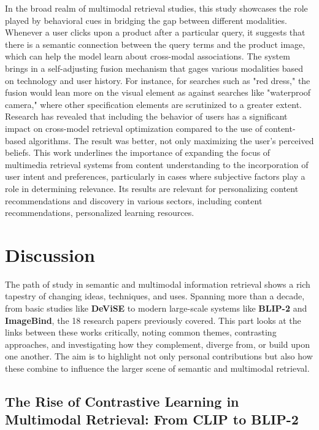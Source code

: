 \documentclass[conference]{IEEEtran}
\begin{document}
\begin{enumerate}
In the broad realm of multimodal retrieval studies, this study showcases the role played by behavioral cues in bridging the gap between different modalities. Whenever a user clicks upon a product after a particular query, it suggests that there is a semantic connection between the query terms and the product image, which can help the model learn about cross-modal associations.
The system brings in a self-adjusting fusion mechanism that gages various modalities based on technology and user history. For instance, for searches such as "red dress," the fusion would lean more on the visual element as against searches like "waterproof camera," where other specification elements are scrutinized to a greater extent.
Research has revealed that including the behavior of users has a significant impact on cross-model retrieval optimization compared to the use of content-based algorithms. The result was better, not only maximizing the user’s perceived beliefs.
This work underlines the importance of expanding the focus of multimedia retrieval systems from content understanding to the incorporation of user intent and preferences, particularly in cases where subjective factors play a role in determining relevance. Its results are relevant for personalizing content recommendations and discovery in various sectors, including content recommendations, personalized learning resources.

\end{enumerate}

\section{Discussion}

The path of study in semantic and multimodal information retrieval shows a rich tapestry of changing ideas, techniques, and uses. Spanning more than a decade, from basic studies like \textbf{DeViSE} to modern large-scale systems like \textbf{BLIP-2} and \textbf{ImageBind}, the 18 research papers previously covered. This part looks at the links between these works critically, noting common themes, contrasting approaches, and investigating how they complement, diverge from, or build upon one another. The aim is to highlight not only personal contributions but also how these combine to influence the larger scene of semantic and multimodal retrieval.

\subsection{The Rise of Contrastive Learning in Multimodal Retrieval: From CLIP to BLIP-2}
\end{document}
